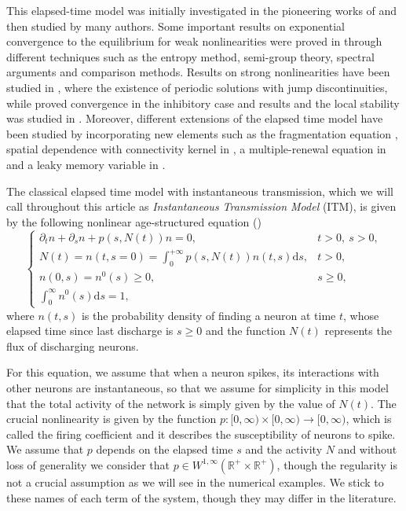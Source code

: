 \documentclass[11pt,a4paper]{article}
\newcommand{\R}{\mathbb{R}}
\newcommand{\dd}{\mathrm{d}}
\begin{document}
This elapsed-time model was initially investigated in the pioneering works of
\cite{pakdaman2009dynamics,pakdaman2013relaxation,pakdaman2014adaptation} and then studied by many authors. Some important results on exponential convergence to the equilibrium for weak nonlinearities were proved in \cite{canizo2019asymptotic,mischler2018,mischler2018weak,caceres2025comparison} through different techniques such as the entropy method, semi-group theory, spectral arguments and comparison methods. Results on strong nonlinearities have been studied in \cite{torres2021elapsed}, where the existence of periodic solutions with jump discontinuities, while \cite{perthame2025strongly} proved convergence in the inhibitory case and results and the local stability was studied in \cite{caceres2025local}. Moreover, different extensions of the elapsed time model have been studied by incorporating new elements such as the fragmentation equation \cite{pakdaman2014adaptation}, spatial dependence with connectivity kernel in \cite{torres2020dynamics,dumont2024oscillations}, a multiple-renewal equation in \cite{torres2022multiple} and a leaky memory variable in \cite{fonte2022long}.

The classical elapsed time model with instantaneous transmission, which we will call throughout this article as \textit{Instantaneous Transmission Model} (ITM), is given by the following nonlinear age-structured equation (\cite{pakdaman2009dynamics})
\begin{equation}\label{eq:model}
\tag{ITM}
\begin{cases}
    \partial_tn+\partial_s n+p(s,N(t))n = 0,  & t>0,\: s>0, \\
    N(t)=n(t,s=0)= \int_0^{+\infty}p(s,N(t))n(t,s) \dd s,& t>0,\\
    n(0,s)=n^0(s)\geq0,& s\geq0,\\
    \int_0^{\infty}n^0(s)\dd s=1,
\end{cases}
\end{equation}
where $n(t,s)$ is the probability density of finding a neuron at time $t$, whose elapsed time since last discharge is $s\ge0$ and the function $N(t)$ represents the flux of discharging neurons.

For this equation, we assume that when a neuron spikes, its interactions with other neurons are instantaneous, so that we assume for simplicity in this model that the total activity of the network is simply given by the value of $N(t)$. The crucial nonlinearity is given by the function $p\colon[0,\infty)\times[0,\infty)\to[0,\infty)$, which is called the firing coefficient and it describes the susceptibility of neurons to spike. We assume that $p$ depends on the elapsed time $s$ and the activity $N$ and without loss of generality we consider that $p\in W^{1,\infty}(\R^+\times\R^+)$, though the regularity is not a crucial assumption as we will see in the numerical examples. We stick to these names of each term of the system, though they may differ in the literature. 
\end{document}
